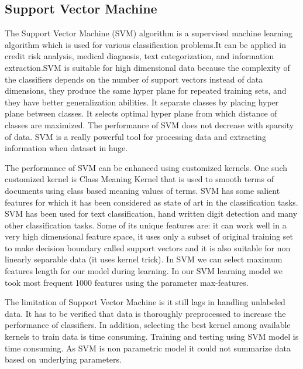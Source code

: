 \subsection{Support Vector Machine}
The Support Vector Machine (SVM) algorithm \cite{villmann2017can} is a supervised machine learning algorithm which is used for various classification problems.It can be applied in credit risk analysis, medical diagnosis, text categorization, and information extraction.SVM is suitable for high dimensional data because the complexity of the classifiers depends on the number
of support vectors instead of data dimensions, they produce the same hyper plane for repeated training sets, and they have better generalization abilities. It separate classes by placing hyper plane between classes. It selects optimal hyper plane from which distance of classes are maximized. The performance of SVM does not decrease with sparsity of data. SVM is a really powerful tool for processing data and extracting information when dataset in huge.
\par 
\vspace{0.5cm}
The performance of SVM can be enhanced using customized kernels. One such customized kernel is Class Meaning Kernel that is used to smooth terms of documents using class based meaning values of terms. SVM has some salient features for which it has been considered as state of art in the classification tasks. SVM has been used for text classification, hand written digit detection and many other classification tasks. Some of its unique features are: it can work well in a very high dimensional feature space, it uses only a subset of original training set to make decision boundary called support vectors and it is also suitable for non linearly separable data (it uses kernel trick). In SVM we can select maximum features length for our model during learning. In our SVM learning model we took most frequent 1000 features using the parameter max-features.  
\par 
\vspace{0.5cm}
The limitation of Support Vector Machine is it still lags in handling unlabeled data. It has to be verified that data is thoroughly preprocessed to increase the performance of classifiers. In addition, selecting the best kernel among available kernels to train data is time consuming. Training and testing using SVM model is time consuming. As SVM is non parametric model it could not summarize data based on underlying parameters. 
\clearpage


